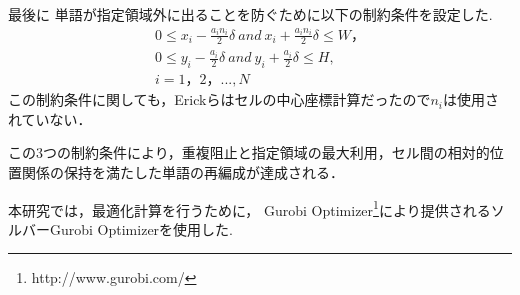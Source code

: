\documentclass[syuuron]{kuee}
\begin{document}
				最後に 単語が指定領域外に出ることを防ぐために以下の制約条件を設定した.
				\begin{eqnarray}
					0 \le x_i  -  \frac{a_i n_i} {2} \delta \:  and \:  x_i  +  \frac{a_i n_i} {2} \delta \le W，\nonumber \\
					0 \le y_i  -  \frac{a_i} {2} \delta  \: and \:  y_i  +  \frac{a_i} {2} \delta \le H ,\\
					i = 1，2，...,N\nonumber
				\end{eqnarray}
				この制約条件に関しても，Erickらはセルの中心座標計算だったので$n_i$は使用されていない．
				
				この3つの制約条件により，重複阻止と指定領域の最大利用，セル間の相対的位置関係の保持を満たした単語の再編成が達成される．
				
				本研究では，最適化計算を行うために，
				Gurobi Optimizer\footnote{http://www.gurobi.com/}により提供されるソルバーGurobi Optimizerを使用した.
	
\end{document}
